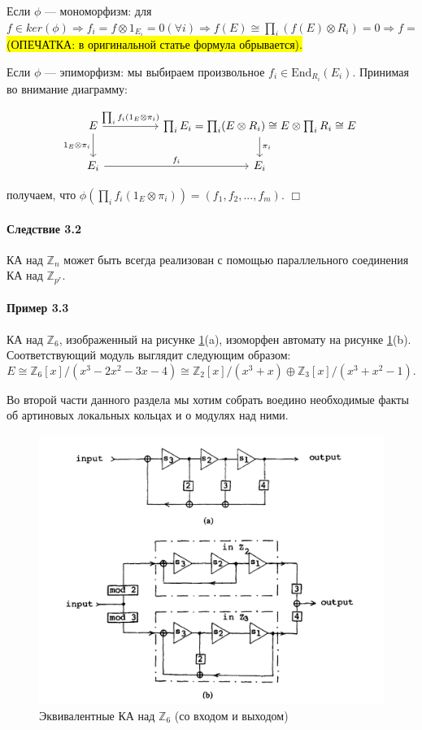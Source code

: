 \documentclass[a4paper,12pt]{article}
\newcommand{\Endom}{\text{End}}
\begin{document}
Если $\phi$ --- мономорфизм: для $f \in ker(\phi) \Rightarrow f_i = f \otimes 1_{E_i} = 0 (\forall i) \Rightarrow f(E) \cong \prod_{i}(f(E) \otimes R_i) = 0 \Rightarrow f = $ \hl{(ОПЕЧАТКА: в оригинальной статье формула обрывается).}

Если $\phi$ --- эпиморфизм: мы выбираем произвольное $f_i \in \Endom_{R_i} (E_i)$. Принимая во внимание диаграмму:

$$
\begin{tikzcd}
	E \ar{rr}{\prod_{i}f_i(1_E \otimes \pi_i)} \dar[']{1_E \otimes \pi_i} && \prod_{i}E_i = \prod_i (E \otimes R_i) \cong E \otimes \prod_{i} R_i \cong E \dar{\pi_i} \\
	E_i  \ar{rr}{f_i} && E_i
\end{tikzcd}
$$

получаем, что $\phi(\prod_i f_i (1_E \otimes \pi_i)) = (f_1, f_2, ..., f_m)$. $\Box$

\paragraph{Следствие 3.2}
КА над $\mathbb{Z}_n$ может быть всегда реализован с помощью параллельного соединения КА над $\mathbb{Z}_{p^r}$.


\paragraph{Пример 3.3}
КА над $\mathbb{Z}_6$, изображенный на рисунке \ref{fig2ab}(a), изоморфен автомату на рисунке \ref{fig2ab}(b). Соответствующий модуль выглядит следующим образом:
$$
E \cong \mathbb{Z}_6 [x] / (x^3 - 2x^2 - 3x - 4) \cong \mathbb{Z}_2 [x] / (x^3 + x) \oplus \mathbb{Z}_3 [x] / (x^3 + x^2 - 1).
$$

Во второй части данного раздела мы хотим собрать воедино необходимые факты об артиновых локальных кольцах и о модулях над ними.

\begin{figure}[h]
	\centering
	\includegraphics[width=0.75\linewidth]{pictures/fig2ab.png}
	\caption{Эквивалентные КА над $\mathbb{Z}_6$ (со входом и выходом)}
	\label{fig2ab}
\end{figure}
\end{document}

